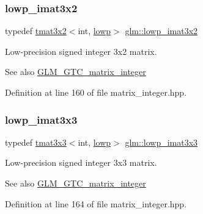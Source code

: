 \subsubsection{\texorpdfstring{lowp\_imat3x2}{lowp\_imat3x2}}
{\footnotesize\ttfamily typedef \mbox{\hyperlink{structglm_1_1tmat3x2}{tmat3x2}}$<$int, \mbox{\hyperlink{namespaceglm_a0f04f086094c747d227af4425893f545ae161af3fc695e696ce3bf69f7332bc2d}{lowp}}$>$ \mbox{\hyperlink{group__gtc__matrix__integer_ga93514d2df726334e6d5edd373635d343}{glm\+::lowp\+\_\+imat3x2}}}

Low-\/precision signed integer 3x2 matrix. \begin{DoxySeeAlso}{See also}
\mbox{\hyperlink{group__gtc__matrix__integer}{G\+L\+M\+\_\+\+G\+T\+C\+\_\+matrix\+\_\+integer}} 
\end{DoxySeeAlso}


Definition at line 160 of file matrix\+\_\+integer.\+hpp.

\mbox{\label{group__gtc__matrix__integer_ga434abdeee9a8908660691be659f6693f}} 
\subsubsection{\texorpdfstring{lowp\_imat3x3}{lowp\_imat3x3}}
{\footnotesize\ttfamily typedef \mbox{\hyperlink{structglm_1_1tmat3x3}{tmat3x3}}$<$int, \mbox{\hyperlink{namespaceglm_a0f04f086094c747d227af4425893f545ae161af3fc695e696ce3bf69f7332bc2d}{lowp}}$>$ \mbox{\hyperlink{group__gtc__matrix__integer_ga434abdeee9a8908660691be659f6693f}{glm\+::lowp\+\_\+imat3x3}}}

Low-\/precision signed integer 3x3 matrix. \begin{DoxySeeAlso}{See also}
\mbox{\hyperlink{group__gtc__matrix__integer}{G\+L\+M\+\_\+\+G\+T\+C\+\_\+matrix\+\_\+integer}} 
\end{DoxySeeAlso}


Definition at line 164 of file matrix\+\_\+integer.\+hpp.

\mbox{\label{group__gtc__matrix__integer_ga61fe3487c1f4f10fb0f5c9fa0873a694}} 
